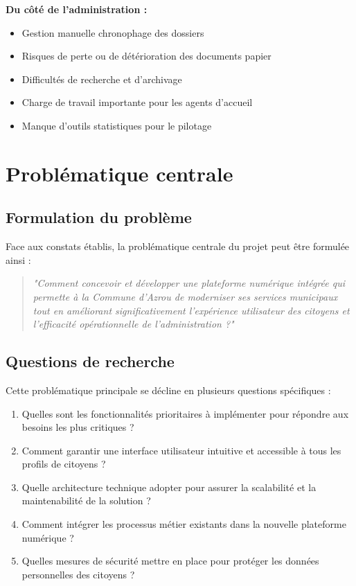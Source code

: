 \textbf{Du côté de l'administration :}
\begin{itemize}
\item Gestion manuelle chronophage des dossiers
\item Risques de perte ou de détérioration des documents papier
\item Difficultés de recherche et d'archivage
\item Charge de travail importante pour les agents d'accueil
\item Manque d'outils statistiques pour le pilotage
\end{itemize}

\section{Problématique centrale}

\subsection{Formulation du problème}

Face aux constats établis, la problématique centrale du projet peut être formulée ainsi :

\begin{quote}
\textit{"Comment concevoir et développer une plateforme numérique intégrée qui permette à la Commune d'Azrou de moderniser ses services municipaux tout en améliorant significativement l'expérience utilisateur des citoyens et l'efficacité opérationnelle de l'administration ?"}
\end{quote}

\subsection{Questions de recherche}

Cette problématique principale se décline en plusieurs questions spécifiques :

\begin{enumerate}
\item Quelles sont les fonctionnalités prioritaires à implémenter pour répondre aux besoins les plus critiques ?
\item Comment garantir une interface utilisateur intuitive et accessible à tous les profils de citoyens ?
\item Quelle architecture technique adopter pour assurer la scalabilité et la maintenabilité de la solution ?
\item Comment intégrer les processus métier existants dans la nouvelle plateforme numérique ?
\item Quelles mesures de sécurité mettre en place pour protéger les données personnelles des citoyens ?
\end{enumerate}

